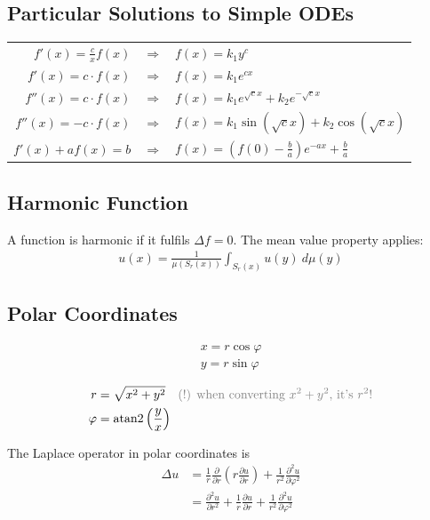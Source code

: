 \subsection{Particular Solutions to Simple ODEs}

\begin{tabular}[h]{rcl}
    $f'(x)=\frac{c}{x}f(x)$ & $\Rightarrow$ & $f(x)=k_1y^c$                                             \\
    $f'(x)=c\cdot f(x)$     & $\Rightarrow$ & $f(x)=k_1e^{cx}$                                          \\
    $f''(x) = c\cdot f(x)$  & $\Rightarrow$ & $f(x) = k_1e^{\sqrt{c}x}+k_2e^{-\sqrt{c}x}$               \\
    $f''(x) = -c\cdot f(x)$ & $\Rightarrow$ & $f(x)=k_1\sin(\sqrt{c}x)+k_2\cos(\sqrt{c}x)$              \\
    $f'(x)+af(x) = b$       & $\Rightarrow$ & $f(x) = \left(f(0)-\frac{b}{a}\right)e^{-ax}+\frac{b}{a}$
\end{tabular}

\subsection{Harmonic Function}

A function is harmonic if it fulfils $\Delta f = 0$. The mean value property applies:
\begin{align*}
    u(x) = \frac{1}{\mu(S_r(x))}\int_{S_r(x)}u(y)\ d\mu(y)
\end{align*}

\subsection{Polar Coordinates}
\begin{align*}
    x = r\cos \varphi \\
    y = r\sin \varphi \\
\end{align*}
\begin{align*}
    r & = \sqrt{x^2+y^2}\quad{\color{gray} \text{(!) when converting } x^2+y^2\text{, it's }r^2!} \\
    \varphi & = \mathrm{atan2}\left(\frac{y}{x}\right)
\end{align*}

The Laplace operator in polar coordinates is
\begin{align*}
    \Delta u & = \frac{1}{r}\frac{\partial}{\partial r}
    \left(r\frac{\partial u}{\partial r}\right)
    +\frac{1}{r^2}\frac{\partial^2 u}{\partial \varphi^2} \\
    & = \frac{\partial^2 u}{\partial r^2}+\frac{1}{r}\frac{\partial u}{\partial r} +
    \frac{1}{r^2}\frac{\partial^2 u}{\partial \varphi^2}
\end{align*}

